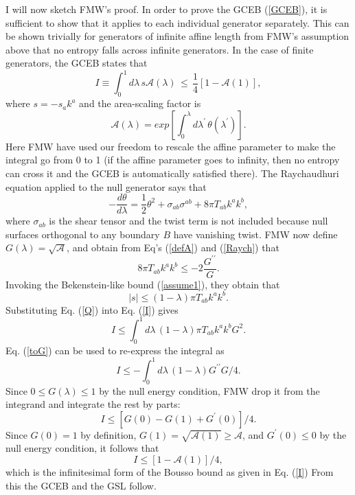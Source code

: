\documentclass{article}
\begin{document}
I will now sketch FMW's proof.  In order to prove the GCEB (\ref{GCEB}), it is sufficient to show that it applies to each individual generator separately.  This can be shown trivially for generators of infinite affine length from FMW's assumption above that no entropy falls across infinite generators.  In the case of finite generators, the GCEB states that
\begin{equation}\label{I}
I \equiv \int_0^1 d\lambda\,s\mathcal{A}(\lambda)\,\le\,\frac{1}{4}[1 - \mathcal{A}(1)],
\end{equation}
where $s = -s_a k^a$ and the area-scaling factor is
\begin{equation}\label{defA}
\mathcal{A}(\lambda) = exp
\left[\int^{\lambda}_0 d\lambda^{\prime}\,\theta(\lambda^{\prime}) \right].
\end{equation}
Here FMW have used our freedom to rescale the affine parameter to make the integral go from 0 to 1 (if the affine parameter goes to infinity, then no entropy can cross it and the GCEB is automatically satisfied there).  The Raychaudhuri equation applied to the null generator says that
\begin{equation}\label{Raych}
-\frac{d\theta}{d\lambda} = \frac{1}{2}\theta^2 
+ \sigma_{ab}\sigma^{ab}
+ 8\pi T_{ab}k^ak^b,
\end{equation}
where $\sigma_{ab}$ is the shear tensor and the twist term is not included because null surfaces orthogonal to any boundary $B$ have vanishing twist.  FMW now define
$G(\lambda) = \sqrt{\mathcal{A}}$, and obtain from Eq's (\ref{defA}) and (\ref{Raych}) that
\begin{equation}\label{toG}
8\pi T_{ab}k^ak^b \le -2\frac{G^{\prime\prime}}{G}.
\end{equation}
Invoking the Bekenstein-like bound (\ref{assume1}), they obtain that
\begin{equation}\label{Q}
|s| \le (1 - \lambda)\pi T_{ab}k^a k^b.
\end{equation}
Substituting Eq. (\ref{Q}) into Eq. (\ref{I}) gives
\begin{equation}
I \le \int_0^1 d\lambda\,(1 - \lambda)\pi T_{ab}k^a k^b G^2.
\end{equation}
Eq. (\ref{toG}) can be used to re-express the integral as
\begin{equation}
I \le - \int_0^1 d\lambda\,(1 -\lambda)G^{\prime\prime}G/4.
\end{equation}
Since $0 \le G(\lambda) \le 1$ by the null energy condition, FMW drop it from the integrand and integrate the rest by parts:
\begin{equation}
I \le [G(0) - G(1) + G^{\prime}(0)]/4.
\end{equation}
Since $G(0) = 1$ by definition, $G(1) = \sqrt{\mathcal{A}(1)} \ge \mathcal{A}$, and $G^{\prime}(0) \le 0$ by the null energy condition, it follows that
\begin{equation}
I \le [1 - \mathcal{A}(1)]/4,
\end{equation}
which is the infinitesimal form of the Bousso bound as given in Eq. (\ref{I})  From this the GCEB and the GSL follow.
\end{document}
